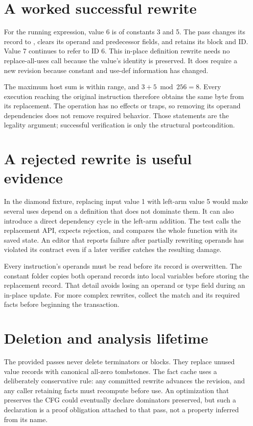 \section{A worked successful rewrite}
\label{sec:pebble-fold-rewrite}
For the running expression, value 6 is  of constants 3 and 5.
The pass changes its record to , clears its operand and predecessor fields, and retains its block and ID.
Value 7 continues to refer to ID 6.
This in-place definition rewrite needs no replace-all-uses call because the value's identity is preserved.
It does require a new revision because constant and use-def information has changed.

The maximum host sum is within range, and $3+5\bmod256=8$.
Every execution reaching the original instruction therefore obtains the same byte from its replacement.
The operation has no effects or traps, so removing its operand dependencies does not remove required behavior.
Those statements are the legality argument; successful verification is only the structural postcondition.

\section{A rejected rewrite is useful evidence}
\label{sec:pebble-reject-rewrite}
In the diamond fixture, replacing input value 1 with left-arm value 5 would make several uses depend on a definition that does not dominate them.
It can also introduce a direct dependency cycle in the left-arm addition.
The test calls the replacement API, expects rejection, and compares the whole function with its saved state.
An editor that reports failure after partially rewriting operands has violated its contract even if a later verifier catches the resulting damage.

Every instruction's operands must be read before its record is overwritten.
The constant folder copies both operand records into local variables before storing the replacement record.
That detail avoids losing an operand or type field during an in-place update.
For more complex rewrites, collect the match and its required facts before beginning the transaction.

\section{Deletion and analysis lifetime}
\label{sec:pebble-delete}
The provided passes never delete terminators or blocks.
They replace unused value records with canonical all-zero tombstones.
The fact cache uses a deliberately conservative rule: any committed rewrite advances the revision, and any caller retaining facts must recompute before use.
An optimization that preserves the CFG could eventually declare dominators preserved, but such a declaration is a proof obligation attached to that pass, not a property inferred from its name.

